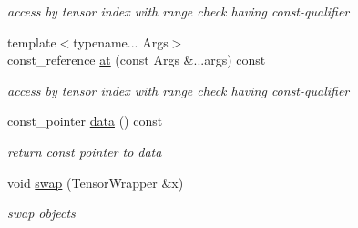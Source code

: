 \begin{DoxyCompactItemize}
\begin{DoxyCompactList}\small\item\em access by tensor index with range check having const-\/qualifier \item\end{DoxyCompactList}\item 
\hypertarget{classbtas_1_1_tensor_wrapper_3_01const_01_t_01_5_00_01_n_00_01_order_01_4_ae7009dffac53dfba42b7be70dc8b52ac}{
{\footnotesize template$<$typename... Args$>$ }\\const\_\-reference \hyperlink{classbtas_1_1_tensor_wrapper_3_01const_01_t_01_5_00_01_n_00_01_order_01_4_ae7009dffac53dfba42b7be70dc8b52ac}{at} (const Args \&...args) const }
\label{classbtas_1_1_tensor_wrapper_3_01const_01_t_01_5_00_01_n_00_01_order_01_4_ae7009dffac53dfba42b7be70dc8b52ac}

\begin{DoxyCompactList}\small\item\em access by tensor index with range check having const-\/qualifier \item\end{DoxyCompactList}\item 
\hypertarget{classbtas_1_1_tensor_wrapper_3_01const_01_t_01_5_00_01_n_00_01_order_01_4_a0424470fc02cc1ee73c3aba5f64b17e6}{
const\_\-pointer \hyperlink{classbtas_1_1_tensor_wrapper_3_01const_01_t_01_5_00_01_n_00_01_order_01_4_a0424470fc02cc1ee73c3aba5f64b17e6}{data} () const }
\label{classbtas_1_1_tensor_wrapper_3_01const_01_t_01_5_00_01_n_00_01_order_01_4_a0424470fc02cc1ee73c3aba5f64b17e6}

\begin{DoxyCompactList}\small\item\em return const pointer to data \item\end{DoxyCompactList}\item 
\hypertarget{classbtas_1_1_tensor_wrapper_3_01const_01_t_01_5_00_01_n_00_01_order_01_4_a1221c30ad4444beb080c69ff2c5e1cab}{
void \hyperlink{classbtas_1_1_tensor_wrapper_3_01const_01_t_01_5_00_01_n_00_01_order_01_4_a1221c30ad4444beb080c69ff2c5e1cab}{swap} (TensorWrapper \&x)}
\label{classbtas_1_1_tensor_wrapper_3_01const_01_t_01_5_00_01_n_00_01_order_01_4_a1221c30ad4444beb080c69ff2c5e1cab}

\begin{DoxyCompactList}\small\item\em swap objects \item\end{DoxyCompactList}\end{DoxyCompactItemize}

